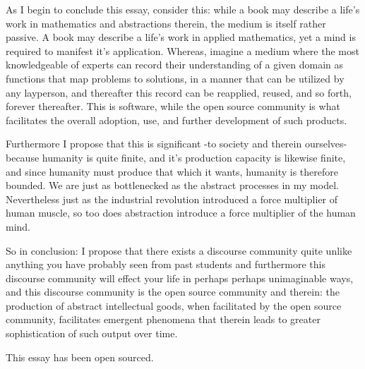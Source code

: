 \documentclass[american, 12pt]{article}
\begin{document}
As I begin to conclude this essay, consider this: while a book may describe a life’s work in mathematics and abstractions therein, the medium is itself rather passive. A book may describe a life’s work in applied mathematics, yet a mind is required to manifest it’s application. Whereas, imagine a medium where the most knowledgeable of experts can record their understanding of a given domain as functions that map problems to solutions, in a manner that can be utilized by any layperson, and thereafter this record can be reapplied, reused, and so forth, forever thereafter. This is software, while the open source community is what facilitates the overall adoption, use, and further development of such products.

Furthermore I propose that this is significant -to society and therein ourselves- because humanity is quite finite, and it’s production capacity is likewise finite, and since humanity must produce that which it wants, humanity is therefore bounded. We are just as bottlenecked as the abstract processes in my model. Nevertheless just as the industrial revolution introduced a force multiplier of human muscle, so too does abstraction introduce a force multiplier of the human mind.

So in conclusion: I propose that there exists a discourse community quite unlike anything you have probably seen from past students and furthermore this discourse community will effect your life in perhaps perhaps unimaginable ways, and this discourse community is the open source community and therein: the production of abstract intellectual goods, when facilitated by the open source community, facilitates emergent phenomena that therein leads to greater sophistication of such output over time. 

\begin{center}
This essay has been open sourced.
\end{center}
\end{document}
